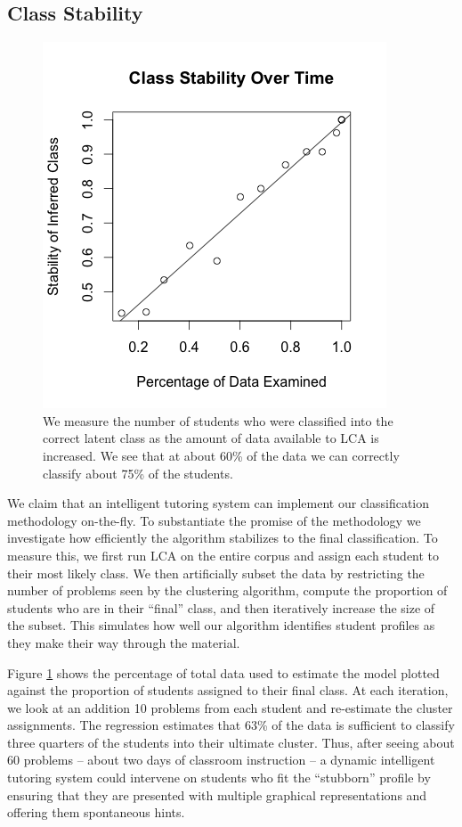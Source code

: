 \documentclass{edm_template}
\begin{document}
\subsection{Class Stability}

\begin{figure}
\includegraphics[scale=.6]{class-stability.png}
\caption{We measure the number of students who were classified into the correct latent class as the amount of data available to LCA is increased. We see that at about 60\% of the data we can correctly classify about 75\% of the students.}
\label{fig:class-stability}
\end{figure}

We claim that an intelligent tutoring system can implement our classification methodology on-the-fly. To substantiate the promise of the methodology we investigate how efficiently the algorithm stabilizes to the final classification. To measure this, we first run LCA on the entire corpus and assign each student to their most likely class. We then artificially subset the data by restricting the number of problems seen by the clustering algorithm, compute the proportion of students who are in their ``final'' class, and then iteratively increase the size of the subset. This simulates how well our algorithm identifies student profiles as they make their way through the material. 

Figure \ref{fig:class-stability} shows the percentage of total data used to estimate the model plotted against the proportion of students assigned to their final class. At each iteration, we look at an addition 10 problems from each student and re-estimate the cluster assignments. The regression estimates that 63\% of the data is sufficient to classify three quarters of the students into their ultimate cluster. Thus, after seeing about 60 problems -- about two days of classroom instruction -- a dynamic intelligent tutoring system could intervene on students who fit the ``stubborn'' profile by ensuring that they are presented with multiple graphical representations and offering them spontaneous hints. 
\end{document}
